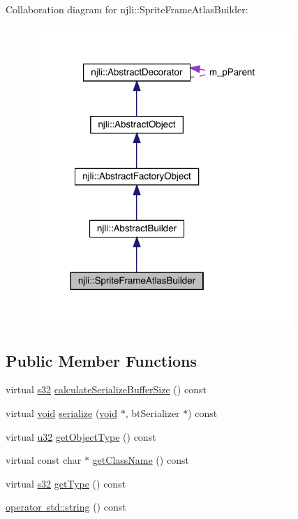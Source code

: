 Collaboration diagram for njli\+:\+:Sprite\+Frame\+Atlas\+Builder\+:\nopagebreak
\begin{figure}[H]
\begin{center}
\leavevmode
\includegraphics[width=278pt]{classnjli_1_1_sprite_frame_atlas_builder__coll__graph}
\end{center}
\end{figure}
\subsection*{Public Member Functions}
\begin{DoxyCompactItemize}
\item 
virtual \mbox{\hyperlink{_util_8h_aa62c75d314a0d1f37f79c4b73b2292e2}{s32}} \mbox{\hyperlink{classnjli_1_1_sprite_frame_atlas_builder_a5e8916db46dc8e1e125c140b5bdaeaca}{calculate\+Serialize\+Buffer\+Size}} () const
\item 
virtual \mbox{\hyperlink{_thread_8h_af1e856da2e658414cb2456cb6f7ebc66}{void}} \mbox{\hyperlink{classnjli_1_1_sprite_frame_atlas_builder_af3f07049fa7006d2bc598661aead34c0}{serialize}} (\mbox{\hyperlink{_thread_8h_af1e856da2e658414cb2456cb6f7ebc66}{void}} $\ast$, bt\+Serializer $\ast$) const
\item 
virtual \mbox{\hyperlink{_util_8h_a10e94b422ef0c20dcdec20d31a1f5049}{u32}} \mbox{\hyperlink{classnjli_1_1_sprite_frame_atlas_builder_ae0ec0c5ec24e4d3c33f80caab2d09c82}{get\+Object\+Type}} () const
\item 
virtual const char $\ast$ \mbox{\hyperlink{classnjli_1_1_sprite_frame_atlas_builder_ab9727608e426483e33c4c8d11ad3dc67}{get\+Class\+Name}} () const
\item 
virtual \mbox{\hyperlink{_util_8h_aa62c75d314a0d1f37f79c4b73b2292e2}{s32}} \mbox{\hyperlink{classnjli_1_1_sprite_frame_atlas_builder_ae452aafd5f7b3bec5944662ffbce3741}{get\+Type}} () const
\item 
\mbox{\hyperlink{classnjli_1_1_sprite_frame_atlas_builder_a862143bc3fff5439c99fabad8259da2c}{operator std\+::string}} () const
\end{DoxyCompactItemize}
